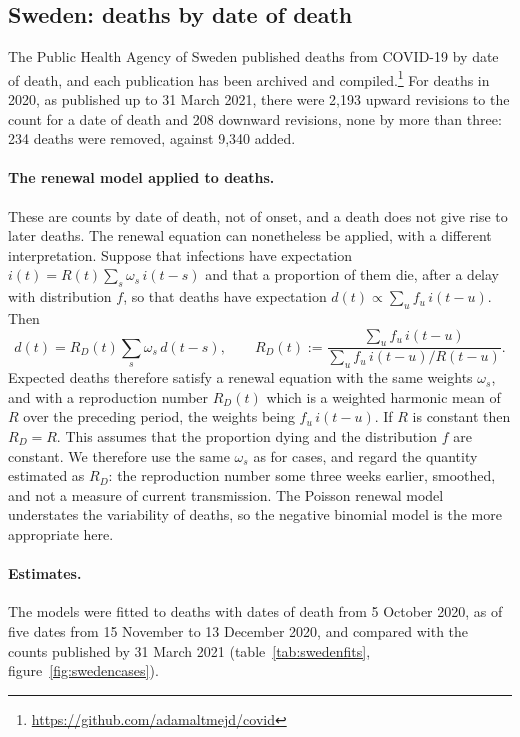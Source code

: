 \documentclass[11pt,a4paper]{article}
\begin{document}
\subsection{Sweden: deaths by date of death}

The Public Health Agency of Sweden published deaths from COVID-19 by date of
death, and each publication has been archived and
compiled.\footnote{\url{https://github.com/adamaltmejd/covid}} For deaths in
2020, as published up to 31 March 2021, there were 2{,}193 upward revisions to
the count for a date of death and 208 downward revisions, none by more than
three: 234 deaths were removed, against 9{,}340 added.

\paragraph{The renewal model applied to deaths.} These are counts by date of
death, not of onset, and a death does not give rise to later deaths. The
renewal equation can nonetheless be applied, with a different interpretation.
Suppose that infections have expectation $i(t)=R(t)\sum_s\omega_s\,i(t-s)$ and
that a proportion of them die, after a delay with distribution $f$, so that
deaths have expectation $d(t)\propto\sum_u f_u\,i(t-u)$. Then
\begin{equation}\label{eq:deaths}
d(t) = R_D(t)\sum_s\omega_s\,d(t-s),
\qquad
R_D(t) := \frac{\sum_u f_u\,i(t-u)}{\sum_u f_u\,i(t-u)/R(t-u)} .
\end{equation}
Expected deaths therefore satisfy a renewal equation with the same weights
$\omega_s$, and with a reproduction number $R_D(t)$ which is a weighted
harmonic mean of $R$ over the preceding period, the weights being $f_u\,i(t-u)$.
If $R$ is constant then $R_D=R$. This assumes that the proportion dying and the
distribution $f$ are constant. We therefore use the same $\omega_s$ as for
cases, and regard the quantity estimated as $R_D$: the reproduction number
some three weeks earlier, smoothed, and not a measure of current transmission.
The Poisson renewal model understates the variability of deaths, so the
negative binomial model is the more appropriate here.

\paragraph{Estimates.} The models were fitted to deaths with dates of death
from 5 October 2020, as of five dates from 15 November to 13 December 2020, and
compared with the counts published by 31 March 2021
(table~\ref{tab:swedenfits}, figure~\ref{fig:swedencases}).
\end{document}
